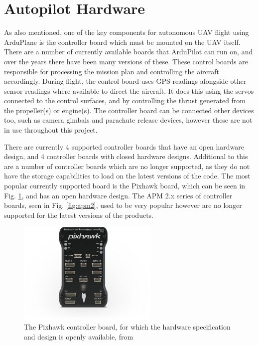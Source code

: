 \section{Autopilot Hardware} 
\label{intro:hardware}

As also mentioned, one of the key components for autonomous UAV flight using ArduPlane is the controller board which must be mounted on the UAV itself. There are a number of currently available boards that ArduPilot can run on, and over the years there have been many versions of these. These control boards are responsible for processing the mission plan and controlling the aircraft accordingly. During flight, the control board uses GPS readings alongside other sensor readings where available to direct the aircraft. It does this using the servos connected to the control surfaces, and by controlling the thrust generated from the propeller(s) or engine(s). The controller board can be connected other devices too, such as camera gimbals and parachute release devices, however these are not in use throughout this project. 

There are currently 4 supported controller boards that have an open hardware design, and 4 controller boards with closed hardware designs. Additional to this are a number of controller boards which are no longer supported, as they do not have the storage capabilities to load on the latest versions of the code. The most popular currently supported board is the Pixhawk board, which can be seen in Fig. \ref{fig:pixhawk}, and has an open hardware design. The APM 2.x series of controller boards, seen in Fig. \ref{fig:apm2}, used to be very popular however are no longer supported for the latest versions of the products.

\begin{figure}[htbp!] 
\centering    
\includegraphics[width=0.6\textwidth]{Pixhawk}
\caption[Pixhawk controller board]{The Pixhawk controller board, for which the hardware specification and design is openly available, from \cite{Pixhawk}}
\label{fig:pixhawk}
\end{figure}

